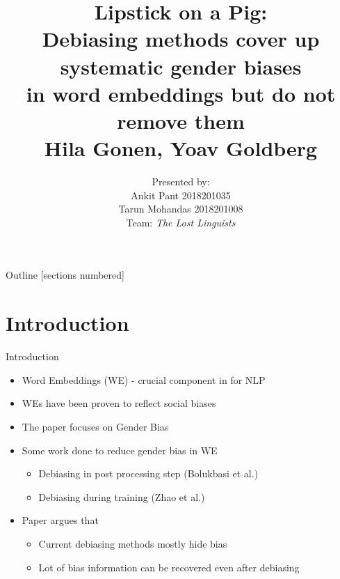 \documentclass{beamer}
\title{\centering Lipstick on a Pig:
	\\ \vspace{2mm} \normalsize{Debiasing methods cover up systematic gender biases\\ 
		in word embeddings but do not remove them \\ \vspace{3mm} 
		Hila Gonen, Yoav Goldberg} \\ \vspace{-5mm}}
\author{Presented by: \\
	Ankit Pant 2018201035 \\ 
	Tarun Mohandas 2018201008 \\
	Team: \textit{The Lost Linguists}
	}
\date{}
\begin{document}
\begin{frame}[plain]
    \maketitle
\end{frame}
\begin{frame}{Outline}
	[sections numbered]
	\tableofcontents
\end{frame}

\section{Introduction}
	\begin{frame}{Introduction}
		\begin{itemize}
			\item Word Embeddings (WE) - crucial component in for NLP
			\item WEs have been proven to reflect social biases
			\item The paper focuses on Gender Bias
			\item Some work done to reduce gender bias in WE
			\begin{itemize}
				\item Debiasing in post processing step (Bolukbasi et al.)
				\item Debiasing during training (Zhao et al.)
			\end{itemize}
			\item Paper argues that 
			\begin{itemize}
				\item Current debiasing methods mostly hide bias
				\item Lot of bias information can be recovered even after debiasing
			\end{itemize}
		\end{itemize}
	\end{frame}
\end{document}
